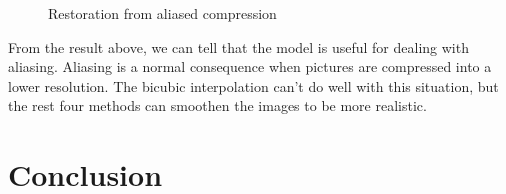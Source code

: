 \documentclass[10pt,twocolumn,letterpaper]{article}
\begin{document}
\begin{figure}[H]
    \caption{Restoration from aliased compression}
\end{figure}
From the result above, we can tell that the model is useful for dealing with aliasing.
Aliasing is a normal consequence when pictures are compressed into a lower resolution.
The bicubic interpolation can't do well with this situation, 
but the rest four methods can smoothen the images to be more realistic.

\section{Conclusion}

{\small


}
\end{document}
